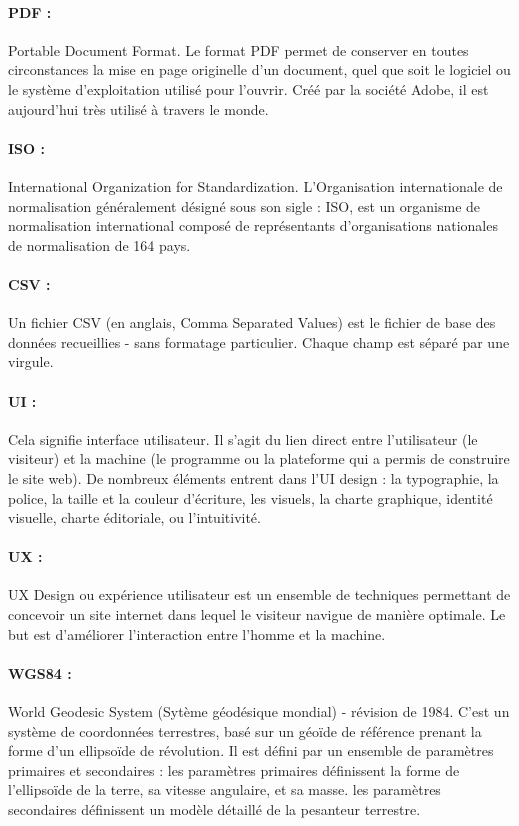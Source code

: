 \paragraph{PDF :}
Portable Document Format. Le format PDF permet de conserver en 
toutes circonstances la mise en page 
originelle d'un document, quel que soit le logiciel ou le système 
d'exploitation utilisé pour l'ouvrir. Créé par la société Adobe, 
il est aujourd'hui très utilisé à travers le monde.

\paragraph{ISO :}
International Organization for Standardization.
L'Organisation internationale de normalisation généralement désigné sous son
 sigle : ISO, est un organisme de normalisation international composé de 
 représentants d'organisations nationales de normalisation de 164 pays.


\paragraph{CSV :}
Un fichier CSV (en anglais, Comma Separated Values) est le fichier de 
base des données recueillies - sans formatage particulier. Chaque 
champ est séparé par une virgule.

\paragraph{UI :}
Cela signifie interface 
utilisateur. Il s’agit du lien direct entre l’utilisateur (le visiteur) 
et la machine (le programme ou la plateforme qui a permis de construire 
le site web). De nombreux éléments entrent dans l’UI design : la typographie, la police, la taille et la 
couleur d’écriture, les visuels, la charte graphique, identité visuelle, 
charte éditoriale, ou l’intuitivité.

\paragraph{UX :}
UX Design ou expérience utilisateur est un ensemble de techniques 
permettant de concevoir un site internet dans lequel le visiteur navigue 
de manière optimale. Le but est d’améliorer l’interaction entre l’homme 
et la machine. 

\paragraph{WGS84 :}
World Geodesic System (Sytème géodésique mondial) - révision de 1984.
C'est un système de coordonnées terrestres, basé sur un géoïde de référence 
prenant la forme d'un ellipsoïde de révolution. Il est 
défini par un ensemble de paramètres primaires et secondaires :
les paramètres primaires définissent la forme de l'ellipsoïde de la terre, sa vitesse angulaire, et sa masse.
les paramètres secondaires définissent un modèle détaillé de la pesanteur terrestre.

